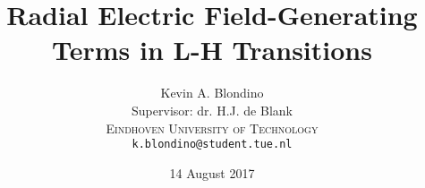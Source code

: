 \documentclass[a4paper,12pt]{article}
\title{Radial Electric Field-Generating Terms in L-H Transitions}
\author{{\Large Kevin A. Blondino} \\
	Supervisor: dr. H.J. de Blank \\
	\textsc{Eindhoven University of Technology} \\
	\texttt{k.blondino@student.tue.nl}}
\date{14 August 2017}
\begin{document}
\maketitle
\begin{abstract}
	\normalsize
	
\end{abstract}
\end{document}
